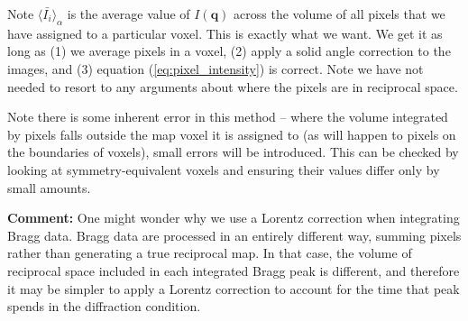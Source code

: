 \documentclass{article}
\begin{document}
Note $\langle \bar{I_i} \rangle_\alpha$ is the average value of $ I(\mathbf{q}) $ across the volume of all pixels that we have assigned to a particular voxel. This is exactly what we want. We get it as long as (1) we average pixels in a voxel, (2) apply a solid angle correction to the images, and (3) equation (\ref{eq:pixel_intensity}) is correct. Note we have not needed to resort to any arguments about where the pixels are in reciprocal space.

Note there is some inherent error in this method -- where the volume integrated by pixels falls outside the map voxel it is assigned to (as will happen to pixels on the boundaries of voxels), small errors will be introduced. This can be checked by looking at symmetry-equivalent voxels and ensuring their values differ only by small amounts.

\textbf{Comment:} One might wonder why we use a Lorentz correction when integrating Bragg data. Bragg data are processed in an entirely different way, summing pixels rather than generating a true reciprocal map. In that case, the volume of reciprocal space included in each integrated Bragg peak is different, and therefore it may be simpler to apply a Lorentz correction to account for the time that peak spends in the diffraction condition.


\end{document}
